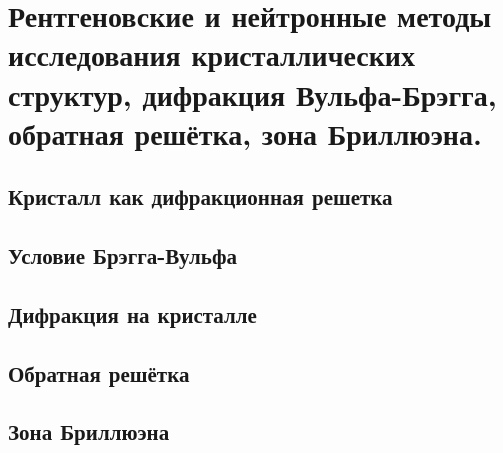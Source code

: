 \section{Рентгеновские и нейтронные методы исследования кристаллических структур, дифракция Вульфа-Брэгга, обратная решётка, зона Бриллюэна.}
\subsection{Кристалл как дифракционная решетка}
\subsection{Условие Брэгга-Вульфа}
\subsection{Дифракция на кристалле}
\subsection{Обратная решётка}
\subsection{Зона Бриллюэна}